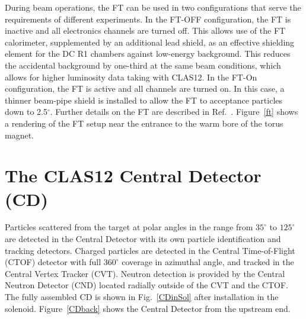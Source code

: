 \documentclass[final,3p,twocolumn]{elsarticle}
\begin{document}
During beam operations, the FT can be used in two configurations that serve the requirements of different
experiments. In the FT-OFF configuration, the FT is inactive and all electronics channels are turned off. This
allows use of the FT calorimeter, supplemented by an additional lead shield, as an effective shielding element for
the DC R1 chambers against low-energy background. This reduces the accidental background by one-third at the
same beam conditions, which allows for higher luminosity data taking with CLAS12. In the FT-On configuration, the
FT is active and all channels are turned on. In this case, a thinner beam-pipe shield is installed to allow the FT
to acceptance particles down to 2.5$^\circ$. Further details on the FT are described in Ref.~\cite{FT}.
Figure~\ref{ft} shows a rendering of the FT setup near the entrance to the warm bore of the torus magnet.   


\section{The CLAS12 Central Detector (CD)}

Particles scattered from the target at polar angles in the range from $35^\circ$  to $125^\circ$ are detected in the
Central Detector with its own particle identification and tracking detectors. Charged particles are detected in the
Central Time-of-Flight (CTOF) detector with full $360^\circ$ coverage in azimuthal angle, and tracked in the Central
Vertex Tracker (CVT). Neutron detection is provided by the Central Neutron Detector (CND) located radially outside
of the CVT and the CTOF.  The fully assembled CD is shown in Fig.~\ref{CDinSol} after installation in the solenoid.
Figure~\ref{CDback} shows the Central Detector from the upstream end.
\end{document}
